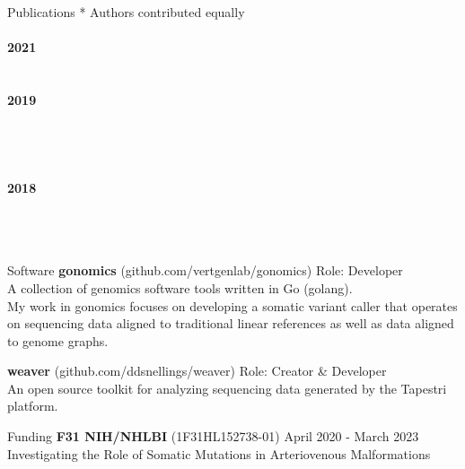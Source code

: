 \documentclass{resume} %
\begin{document}
\begin{rSection}{Publications}
{* Authors contributed equally}
\\ \\ {\bf 2021} 
\\ 
\\ \\{\bf 2019} 
\\ 
\\ \\ 
\\ \\ {\bf 2018}
\\ 
\\ \\ 
\\
\end{rSection}


\begin{rSection}{Software}
{\bf gonomics} {(github.com/vertgenlab/gonomics)} \hfill{Role: Developer}
\\ {A collection of genomics software tools written in Go (golang).}
\\ {My work in gonomics focuses on developing a somatic variant caller that operates on sequencing data 
aligned to traditional linear references as well as data aligned to genome graphs.}

{\bf weaver} {(github.com/ddsnellings/weaver)} \hfill{Role: Creator \& Developer}
\\ {An open source toolkit for analyzing sequencing data generated by the Tapestri platform.}

\end{rSection}

\begin{rSection}{Funding}
{\bf F31 NIH/NHLBI  }{(1F31HL152738-01)}  \hfill {April 2020 - March 2023}\\
Investigating the Role of Somatic Mutations in Arteriovenous Malformations\\
\end{rSection}
\end{document}
